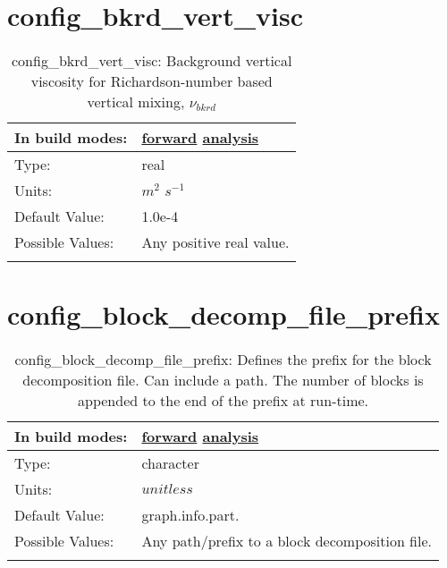 \section[config\_bkrd\_vert\_visc]{config\_bkrd\_vert\_visc}
\label{sec:nm_sec_config_bkrd_vert_visc}
\begin{center}
\begin{longtable}{| p{2.0in} || p{4.0in} |}
    \hline
    In build modes: & \hyperref[subsec:forward_nm_tab_vmix_rich]{forward} \hyperref[subsec:analysis_nm_tab_vmix_rich]{analysis} \\
    \hline
    Type: & real \\
    \hline
    Units: & $m^2$ $s^{-1}$ \\
    \hline
    Default Value: & 1.0e-4 \\
    \hline
    Possible Values: & Any positive real value. \\
    \hline
    \caption{config\_bkrd\_vert\_visc:  Background vertical viscosity for Richardson-number based vertical mixing,  $\nu_{bkrd}$ }
\end{longtable}
\end{center}
\section[config\_block\_decomp\_file\_prefix]{config\_block\_decomp\_file\_prefix}
\label{sec:nm_sec_config_block_decomp_file_prefix}
\begin{center}
\begin{longtable}{| p{2.0in} || p{4.0in} |}
    \hline
    In build modes: & \hyperref[subsec:forward_nm_tab_decomposition]{forward} \hyperref[subsec:analysis_nm_tab_decomposition]{analysis} \\
    \hline
    Type: & character \\
    \hline
    Units: & $unitless$ \\
    \hline
    Default Value: & graph.info.part. \\
    \hline
    Possible Values: & Any path/prefix to a block decomposition file. \\
    \hline
    \caption{config\_block\_decomp\_file\_prefix: Defines the prefix for the block decomposition file. Can include a path. The number of blocks is appended to the end of the prefix at run-time.}
\end{longtable}
\end{center}
